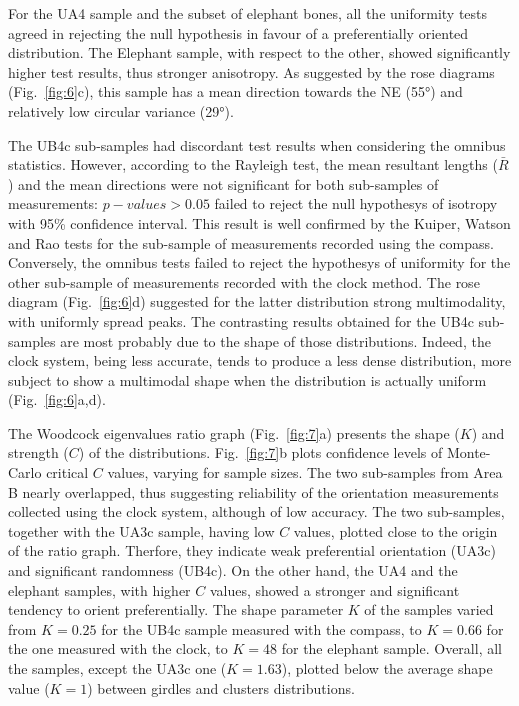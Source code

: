 \documentclass[preprint,authoryear,times]{elsarticle} %
\begin{document}
For the UA4 sample and the subset of elephant bones, all the uniformity tests agreed in rejecting the null hypothesis in favour of a preferentially oriented distribution. The Elephant sample, with respect to the other, showed significantly higher test results, thus stronger anisotropy. As suggested by the rose diagrams (Fig.~\ref{fig:6}c), this sample has a mean direction towards the NE (55°) and relatively low circular variance (29°).

The UB4c sub-samples had discordant test results when considering the omnibus statistics. However, according to the Rayleigh test, the mean resultant lengths ($\bar{R}$) and the mean directions were not significant for both sub-samples of measurements: $p-values>0.05$ failed to reject the null hypothesys of isotropy with 95\% confidence interval. This result is well confirmed by the Kuiper, Watson and Rao tests for the sub-sample of measurements recorded using the compass. Conversely, the omnibus tests failed to reject the hypothesys of uniformity for the other sub-sample of measurements recorded with the clock method. The rose diagram (Fig.~\ref{fig:6}d) suggested for the latter distribution strong multimodality, with uniformly spread peaks. The contrasting results obtained for the UB4c sub-samples are most probably due to the shape of those distributions. Indeed, the clock system, being less accurate, tends to produce a less dense distribution, more subject to show a multimodal shape when the distribution is actually uniform (Fig.~\ref{fig:6}a,d).

The Woodcock eigenvalues ratio graph (Fig.~\ref{fig:7}a) presents the shape ($K$) and strength ($C$) of the distributions. Fig.~\ref{fig:7}b plots confidence levels of Monte-Carlo critical $C$ values, varying for sample sizes. The two sub-samples from Area B nearly overlapped, thus suggesting reliability of the orientation measurements collected using the clock system, although of low accuracy. The two sub-samples, together with the UA3c sample, having low $C$ values, plotted close to the origin of the ratio graph. Therfore, they indicate weak preferential orientation (UA3c) and significant randomness (UB4c). On the other hand, the UA4 and the elephant samples, with higher $C$ values, showed a stronger and significant tendency to orient preferentially. The shape parameter $K$ of the samples varied from $K=0.25$ for the UB4c sample measured with the compass, to $K=0.66$ for the one measured with the clock, to $K=48$ for the elephant sample. Overall, all the samples, except the UA3c one ($K=1.63$), plotted below the average shape value ($K=1$) between girdles and clusters distributions.
\end{document}
